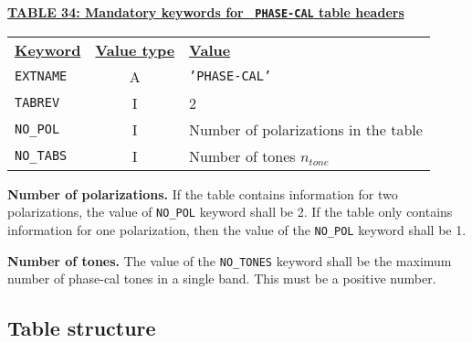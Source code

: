 \documentclass[twoside]{article}
\newcommand{\Hi}[1]{\textcolor{hicol}{#1}}
\newcommand{\ntone}{$n_{tone}$}
\begin{document}
\begin{center}
\underline{\bf{TABLE \Hi{34}: Mandatory keywords for {\tt
    PHASE-CAL} table headers}}\\
\begin{tabular}{lcl}
\noalign{\vspace{2pt}}
\underline{{\bf Keyword}} & \underline{\bf{Value type}} &
    \underline{\bf{Value\vphantom{y}}} \\
\noalign{\vspace{2pt}}
{\tt EXTNAME}   & A & {\tt 'PHASE-CAL'}  \\
{\tt TABREV}    & I & 2 \\
{\tt NO\_POL}   & I & Number of polarizations in the table \\
{\tt NO\_TABS}  & I & Number of tones \ntone
\end{tabular}
\end{center}

{\bf Number of polarizations.}  If the table contains information for
two polarizations, the value of {\tt NO\_POL} keyword shall be 2.  If
the table only contains information for one polarization, then the
value of the {\tt NO\_POL} keyword shall be 1.

{\bf Number of tones.} The value of the {\tt NO\_TONES} keyword shall
be the maximum number of phase-cal tones in a single band.  This must
be a positive number.

\subsection{Table structure}
\end{document}
